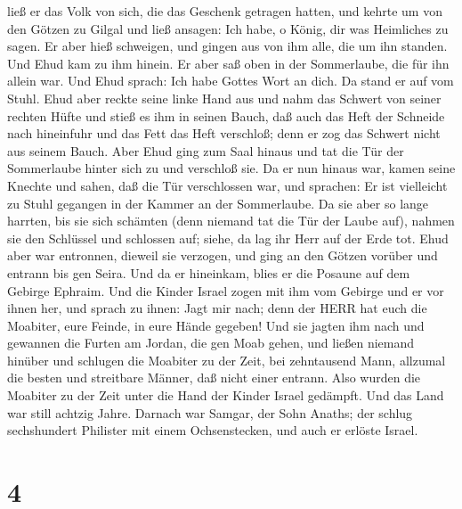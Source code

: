 ließ er das Volk von sich, die das Geschenk getragen hatten,
 und kehrte um von den Götzen zu Gilgal und ließ ansagen:
Ich habe, o König, dir was Heimliches zu sagen. Er aber hieß schweigen,
und gingen aus von ihm alle, die um ihn standen.  Und Ehud
kam zu ihm hinein. Er aber saß oben in der Sommerlaube, die für ihn
allein war. Und Ehud sprach: Ich habe Gottes Wort an dich. Da stand er
auf vom Stuhl.  Ehud aber reckte seine linke Hand aus und
nahm das Schwert von seiner rechten Hüfte und stieß es ihm in seinen
Bauch,  daß auch das Heft der Schneide nach hineinfuhr und
das Fett das Heft verschloß; denn er zog das Schwert nicht aus seinem
Bauch.  Aber Ehud ging zum Saal hinaus und tat die Tür der
Sommerlaube hinter sich zu und verschloß sie.  Da er nun
hinaus war, kamen seine Knechte und sahen, daß die Tür verschlossen war,
und sprachen: Er ist vielleicht zu Stuhl gegangen in der Kammer an der
Sommerlaube.  Da sie aber so lange harrten, bis sie sich
schämten (denn niemand tat die Tür der Laube auf), nahmen sie den
Schlüssel und schlossen auf; siehe, da lag ihr Herr auf der Erde tot.
 Ehud aber war entronnen, dieweil sie verzogen, und ging an
den Götzen vorüber und entrann bis gen Seira.  Und da er
hineinkam, blies er die Posaune auf dem Gebirge Ephraim. Und die Kinder
Israel zogen mit ihm vom Gebirge und er vor ihnen her,  und
sprach zu ihnen: Jagt mir nach; denn der HERR hat euch die Moabiter,
eure Feinde, in eure Hände gegeben! Und sie jagten ihm nach und gewannen
die Furten am Jordan, die gen Moab gehen, und ließen niemand hinüber
 und schlugen die Moabiter zu der Zeit, bei zehntausend
Mann, allzumal die besten und streitbare Männer, daß nicht einer
entrann.  Also wurden die Moabiter zu der Zeit unter die
Hand der Kinder Israel gedämpft. Und das Land war still achtzig Jahre.
 Darnach war Samgar, der Sohn Anaths; der schlug
sechshundert Philister mit einem Ochsenstecken, und auch er erlöste
Israel.

\hypertarget{section-3}{%
\section{4}\label{section-3}}


